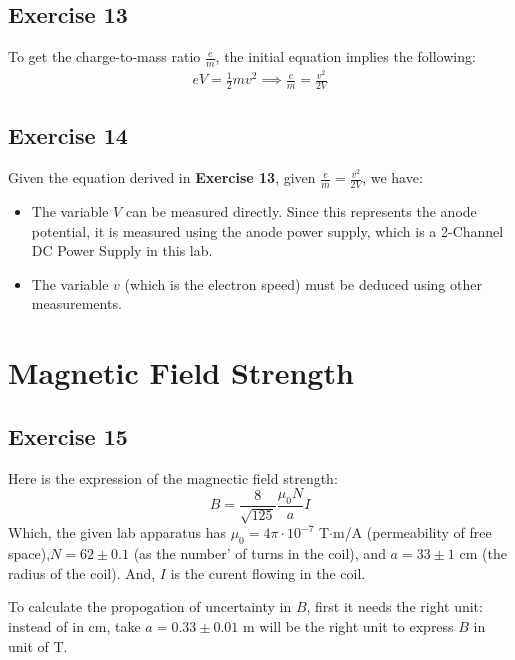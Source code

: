 \documentclass{article}
\begin{document}
\subsection{Exercise 13}

To get the charge-to-mass ratio $\frac{e}{m}$, the initial equation implies the following:
\begin{align}
    e V = \frac{1}{2}mv^2 \implies \frac{e}{m} = \frac{v^2}{2V}
\end{align}

\hfil

\subsection{Exercise 14}

Given the equation derived in \textbf{Exercise 13}, given $\frac{e}{m} = \frac{v^2}{2V}$, we have:
\begin{itemize}
    \item The variable $V$ can be measured directly. Since this represents the anode potential, it is measured using the anode power supply, which is a 2-Channel DC Power Supply in this lab.
    \item The variable $v$ (which is the electron speed) must be deduced using other measurements.
\end{itemize}

\newpage

\section{Magnetic Field Strength}
\subsection{Exercise 15}
Here is the expression of the magnectic field strength:
\begin{equation}
    B = \frac{8}{\sqrt{125}}\frac{\mu_0 N}{a}I
\end{equation}
Which, the given lab apparatus has $\mu_0 = 4\pi \cdot 10^{-7}$ T$\cdot$m/A (permeability of free space),$N = 62\pm 0.1$ (as the number' of turns in the coil), and $a = 33\pm 1$ cm (the radius of the coil). And, $I$ is the curent flowing in the coil.

\hfil

To calculate the propogation of uncertainty in $B$, first it needs the right unit: instead of in cm, take $a = 0.33 \pm 0.01$ m will be the right unit to express $B$ in unit of T.
\end{document}
